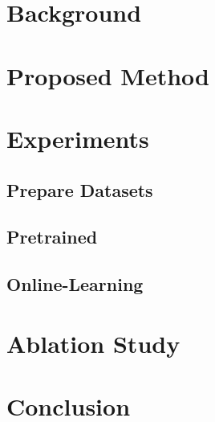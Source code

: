 \documentclass[lettersize,journal]{IEEEtran}
\begin{document}
	\section{Background}

	\section{Proposed Method}

	\section{Experiments}
		\subsection{Prepare Datasets}
		\subsection{Pretrained}
		\subsection{Online-Learning}

	\section{Ablation Study}%

	\section{Conclusion}%


	
\end{document}
